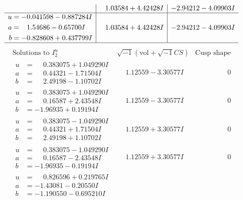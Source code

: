 \documentclass[1p]{elsarticle_modified}
\theoremstyle{definition}
\newcommand{\I}{\sqrt{-1}}
\begin{document}
$$\begin{array}{c|c|c}
 & \phantom{-}1.03584 + 4.42428 I & -2.94212 - 4.09903 I \\ \hline\begin{aligned}
u &= -0.041598 - 0.887284 I \\
a &= \phantom{-}1.54686 - 0.65700 I \\
b &= -0.828608 + 0.437799 I\end{aligned}
 & \phantom{-}1.03584 + 4.42428 I & -2.94212 - 4.09903 I\\
 \hline 
 \end{array}$$\newpage$$\begin{array}{c|c|c}  
\text{Solutions to }I^u_{2}& \I (\text{vol} + \sqrt{-1}CS) & \text{Cusp shape}\\
 \hline 
\begin{aligned}
u &= \phantom{-}0.383075 + 1.049290 I \\
a &= \phantom{-}0.44321 - 1.71504 I \\
b &= \phantom{-}2.49198 - 1.10702 I\end{aligned}
 & \phantom{-}1.12559 - 3.30577 I & \phantom{-0.000000 } 0 \\ \hline\begin{aligned}
u &= \phantom{-}0.383075 + 1.049290 I \\
a &= \phantom{-}0.16587 + 2.43548 I \\
b &= -1.96935 + 0.19194 I\end{aligned}
 & \phantom{-}1.12559 - 3.30577 I & \phantom{-0.000000 } 0 \\ \hline\begin{aligned}
u &= \phantom{-}0.383075 - 1.049290 I \\
a &= \phantom{-}0.44321 + 1.71504 I \\
b &= \phantom{-}2.49198 + 1.10702 I\end{aligned}
 & \phantom{-}1.12559 + 3.30577 I & \phantom{-0.000000 } 0 \\ \hline\begin{aligned}
u &= \phantom{-}0.383075 - 1.049290 I \\
a &= \phantom{-}0.16587 - 2.43548 I \\
b &= -1.96935 - 0.19194 I\end{aligned}
 & \phantom{-}1.12559 + 3.30577 I & \phantom{-0.000000 } 0 \\ \hline\begin{aligned}
u &= \phantom{-}0.826596 + 0.219765 I \\
a &= -1.43081 - 0.20550 I \\
b &= -1.190550 - 0.695210 I\end{aligned}

\end{array}$$
\end{document}
